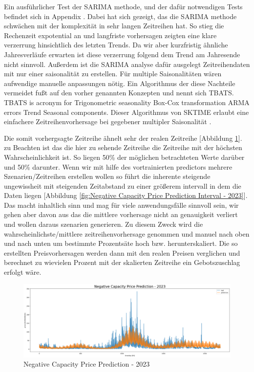 Ein ausführlicher Test der SARIMA methode, und der dafür notwendigen Tests befindet sich in Appendix . Dabei hat sich gezeigt, das die SARIMA methode schwächen mit der
komplexität in sehr langen Zeitreihen hat. So stieg die Rechenzeit expotential an und langfriste vorhersagen zeigten eine klare verzerrung hinsichtlich des letzten Trends.
Da wir aber kurzfristig ähnliche Jahresverläufe erwarten ist diese verzerrung folgend dem Trend am Jahresende nicht sinnvoll.
Außerdem ist die SARIMA analyse dafür ausgelegt Zeitreihendaten mit nur einer saisonalität zu erstellen. Für multiple Saisonalitäten wären aufwendige
manuelle anpassungen nötig. Ein Algorithmus der diese Nachteile vermeidet fußt auf den vorher genannten Konzepten und nennt sich TBATS.
TBATS is acronym for Trigonometric seasonality Box-Cox transformation ARMA errors Trend Seasonal components. Dieser Algorithmus von SKTIME erlaubt eine
einfachere Zeitreihenvorhersage bei gegebener multipler Saisonalität \cite{.05.04.2025}. 

Die somit vorhergsagte Zeitreihe ähnelt sehr der realen Zeitreihe [Abbildung \ref{fig:Negative Capacity Price Prediction - 2023}]. zu Beachten ist das die hier zu sehende Zeitreihe die Zeitreihe mit der höchsten Wahrscheinlichkeit ist.
So liegen 50\% der möglichen betrachteten Werte darüber und 50\% darunter. Wenn wir mit hilfe des vortrainierten predictors mehrere Szenarien/Zeitreihen
erstellen wollen so führt die inherente steigende ungewissheit mit steigenden Zeitabstand zu einer größerem intervall in dem die Daten liegen [Abbildung \ref{fig:Negative Capacity Price Prediction Interval - 2023}].
Das macht inhaltlich sinn und mag für viele anwendungsfälle sinnvoll sein, wir gehen aber davon aus das die mittlere vorhersage nicht an genauigkeit verliert
und wollen daraus szenarien generieren. Zu diesem Zweck wird die wahrscheinlichste/mittlere zeitreihenvorhersage genommen und manuel nach oben und nach unten
um bestimmte Prozentsäte hoch bzw. herunterskaliert. Die so erstellten Preisvorhersagen werden dann mit den realen Preisen verglichen und berechnet zu wievielen
Prozent mit der skalierten Zeitreihe ein Gebotszuschlag erfolgt wäre.

\begin{figure}[!h]
	\includegraphics[width=1\linewidth]{pictures/RL/Negative Capacity Price Prediction - 2023.png}
	\caption{Negative Capacity Price Prediction - 2023}
	\label{fig:Negative Capacity Price Prediction - 2023}
\end{figure}


